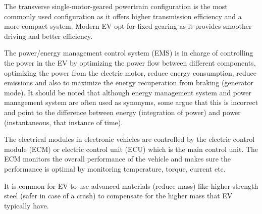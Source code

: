 The transverse single-motor-geared powertrain configuration is the most commonly used configuration as it offers higher transmission efficiency and a more compact system\:\cite{chauEVPowertrainConfigurations2014}.
Modern EV opt for fixed gearing as it provides smoother driving and better efficiency\:\cite{chauEVPowertrainConfigurations2014}.

The power/energy management control system (EMS) is in charge of controlling the power in the EV by optimizing the power flow between different components, optimizing the power from the electric motor, reduce energy consumption, reduce emissions and also to maximize the energy recuperation from braking (generator mode)\:\cite{khajepourElectricHybridVehicles2014}\cite{un-noorComprehensiveStudyKey2017}\cite{kumarDevelopmentSchemeKey2017}\cite{tranThoroughStateoftheartAnalysis2020}.
It should be noted that although energy management system and power management system are often used as synonyms, some argue that this is incorrect and point to the difference between energy (integration of power) and power (instantaneous, that instance of time)\:\cite{khajepourElectricHybridVehicles2014}.

The electrical modules in electronic vehicles are controlled by the electric control module (ECM) or electric control unit (ECU) which is the main control unit\:\cite{khajepourElectricHybridVehicles2014}. The ECM monitors the overall performance of the vehicle and makes sure the performance is optimal by monitoring temperature, torque, current etc\:\cite{khajepourElectricHybridVehicles2014}. 

It is common for EV to use advanced materials (reduce mass) like higher strength steel (safer in case of a crash) to compensate for the higher mass that EV typically have\:\cite{khajepourElectricHybridVehicles2014}.


